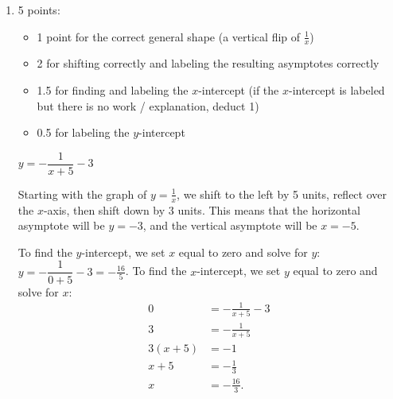 \documentclass{article}
\begin{document}
\begin{enumerate}
\begin{enumerate}
\begin{solution}
    \end{solution}

  \item

    \begin{grading}
      5 points:
      \begin{itemize}[nosep]
      \item 1 point for the correct general shape (a vertical flip of $\frac{1}{x}$)
      \item 2 for shifting correctly and labeling the resulting asymptotes correctly
      \item 1.5 for finding and labeling the $x$-intercept (if the $x$-intercept is labeled but there is no work / explanation, deduct 1)
      \item 0.5 for labeling the $y$-intercept
      \end{itemize}
    \end{grading}

    \begin{problem}[\vfill\newpage]
      $y = - \dfrac{1}{x + 5} - 3$      
    \end{problem}

    \begin{solution}
      Starting with the graph of $y=\frac{1}{x}$, we shift to the left by 5 units, reflect
      over the $x$-axis, then shift down by 3 units. This means that the horizontal asymptote
      will be $y=-3$, and the vertical asymptote will be $x=-5$.

      To find the $y$-intercept, we set $x$ equal to zero and solve for $y$: $y=-\dfrac{1}{0+5}-3
      = -\frac{16}{5}$. To find the $x$-intercept, we set $y$ equal to zero and solve for $x$:
      \begin{align*}
        0 &= -\frac{1}{x+5} -3 \\
        3 &= -\frac{1}{x+5} \\
        3(x+5) &= -1 \\
        x+5 &= -\frac{1}{3} \\
        x &= -\frac{16}{3}.
      \end{align*}


\end{solution}
\end{enumerate}
\end{enumerate}
\end{document}
